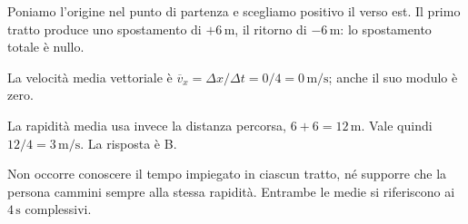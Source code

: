\documentclass[11pt,a4paper]{article}
\begin{document}
\begin{samepage}
Poniamo l’origine nel punto di partenza e scegliamo positivo il verso est. Il primo tratto produce uno spostamento di \(+6\,\mathrm{m}\), il ritorno di \(-6\,\mathrm{m}\): lo spostamento totale è nullo.\par

La velocità media vettoriale è \(\overline{v}_x=\Delta x/\Delta t=0/4=0\,\mathrm{m/s}\); anche il suo modulo è zero.\par

La rapidità media usa invece la distanza percorsa, \(6+6=12\,\mathrm{m}\). Vale quindi \(12/4=3\,\mathrm{m/s}\). La risposta è B.\par

Non occorre conoscere il tempo impiegato in ciascun tratto, né supporre che la persona cammini sempre alla stessa rapidità. Entrambe le medie si riferiscono ai \(4\,\mathrm{s}\) complessivi.\par

\end{samepage}
\newpage
\end{document}
